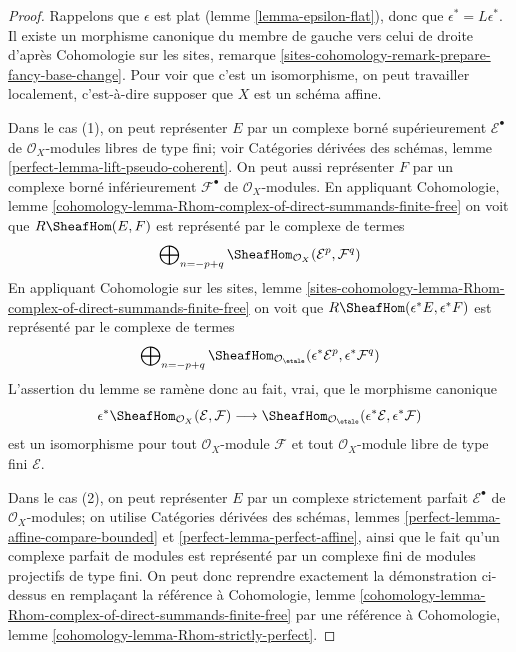 \begin{proof}
Rappelons que $\epsilon$ est plat (lemme \ref{lemma-epsilon-flat}), donc que
$\epsilon^*=L\epsilon^*$. Il existe un morphisme canonique du membre de gauche
vers celui de droite d'apr\`es Cohomologie sur les sites, remarque
\ref{sites-cohomology-remark-prepare-fancy-base-change}.
Pour voir que c'est un isomorphisme, on peut travailler localement, c'est-\`a-dire
supposer que $X$ est un sch\'ema affine.

\medskip\noindent
Dans le cas (1), on peut repr\'esenter $E$ par un complexe born\'e
sup\'erieurement $\mathcal{E}^\bullet$ de $\mathcal{O}_X$-modules libres de
type fini; voir Cat\'egories d\'eriv\'ees des sch\'emas, lemme
\ref{perfect-lemma-lift-pseudo-coherent}. On peut aussi repr\'esenter $F$ par
un complexe born\'e inf\'erieurement $\mathcal{F}^\bullet$ de
$\mathcal{O}_X$-modules. En appliquant Cohomologie, lemme
\ref{cohomology-lemma-Rhom-complex-of-direct-summands-finite-free}
on voit que $R\SheafHom(E,F)$ est repr\'esent\'e par le complexe de termes
$$
\bigoplus\nolimits_{n = - p + q}
\SheafHom_{\mathcal{O}_X}(\mathcal{E}^p, \mathcal{F}^q)
$$
En appliquant Cohomologie sur les sites, lemme
\ref{sites-cohomology-lemma-Rhom-complex-of-direct-summands-finite-free}
on voit que $R\SheafHom(\epsilon^*E,\epsilon^*F)$ est repr\'esent\'e par le
complexe de termes
$$
\bigoplus\nolimits_{n = - p + q}
\SheafHom_{\mathcal{O}_\etale}
(\epsilon^*\mathcal{E}^p, \epsilon^*\mathcal{F}^q)
$$
L'assertion du lemme se ram\`ene donc au fait, vrai, que le morphisme canonique
$$
\epsilon^*\SheafHom_{\mathcal{O}_X}(\mathcal{E}, \mathcal{F})
\longrightarrow
\SheafHom_{\mathcal{O}_\etale}
(\epsilon^*\mathcal{E}, \epsilon^*\mathcal{F})
$$
est un isomorphisme pour tout $\mathcal{O}_X$-module $\mathcal{F}$ et tout
$\mathcal{O}_X$-module libre de type fini $\mathcal{E}$.

\medskip\noindent
Dans le cas (2), on peut repr\'esenter $E$ par un complexe strictement parfait
$\mathcal{E}^\bullet$ de $\mathcal{O}_X$-modules; on utilise Cat\'egories
d\'eriv\'ees des sch\'emas, lemmes
\ref{perfect-lemma-affine-compare-bounded} et
\ref{perfect-lemma-perfect-affine}, ainsi que le fait qu'un complexe parfait
de modules est repr\'esent\'e par un complexe fini de modules projectifs de
type fini. On peut donc reprendre exactement la d\'emonstration ci-dessus en
rempla\c{c}ant la r\'ef\'erence \`a Cohomologie, lemme
\ref{cohomology-lemma-Rhom-complex-of-direct-summands-finite-free}
par une r\'ef\'erence \`a Cohomologie, lemme
\ref{cohomology-lemma-Rhom-strictly-perfect}.
\end{proof}

